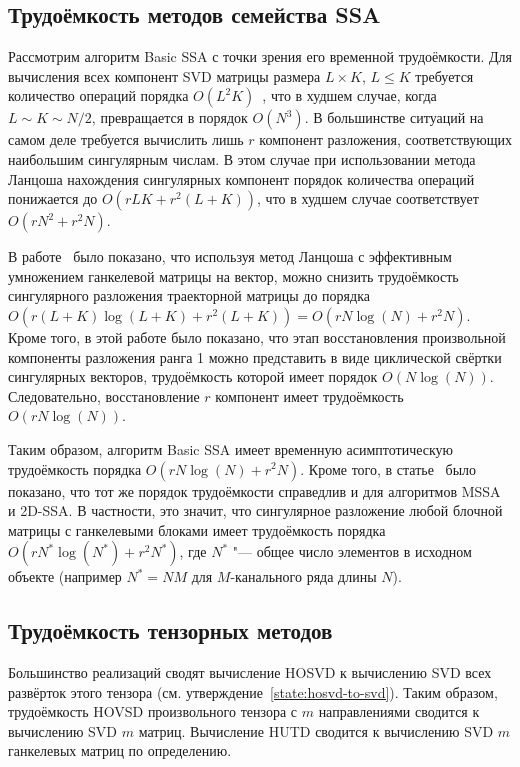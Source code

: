 \documentclass[specialist,
  substylefile = spbu.rtx,
subf,href,colorlinks=true, 12pt]{disser}
\theoremstyle{plain}
\theoremstyle{definition}
\theoremstyle{remark}
\def\newdecomp/{HUTD}
\begin{document}
\subsection{Трудоёмкость методов семейства SSA}\label{subsec:eff-ssa}
Рассмотрим алгоритм Basic SSA с точки зрения его временной трудоёмкости.
Для вычисления всех компонент SVD матрицы размера $L \times K$, $L
\leqslant K$ требуется количество операций порядка $O(L^2
K)$~\cite{Golub1965,Golub1970}, что в
худшем случае, когда $L \sim K \sim N / 2$, превращается в порядок $O(N^3)$.
В большинстве ситуаций на самом деле требуется вычислить лишь $r$ компонент
разложения, соответствующих наибольшим сингулярным числам. В этом
случае при использовании метода Ланцоша нахождения сингулярных
компонент порядок количества операций
понижается до $O(rLK + r^2 (L + K))$, что
в худшем случае соответствует $O(rN^2 + r^2N)$.

В работе~\cite{Korobeynikov2010} было показано, что используя
метод Ланцоша с эффективным умножением ганкелевой матрицы на вектор,
можно снизить трудоёмкость сингулярного разложения траекторной
матрицы до порядка $O(r (L + K) \log(L + K) + r^2 (L + K)) = O(rN
\log(N) + r^2 N)$. Кроме того, в этой работе было показано, что этап
восстановления произвольной компоненты разложения ранга 1 можно представить в
виде циклической свёртки сингулярных векторов, трудоёмкость которой
имеет порядок $O(N \log(N))$. Следовательно, восстановление $r$
компонент имеет трудоёмкость $O(rN \log(N))$.

Таким образом, алгоритм Basic SSA имеет временную асимптотическую
трудоёмкость порядка $O(r N \log (N) + r^2 N)$.
Кроме того, в статье~\cite{mssa2} было показано, что тот же
порядок трудоёмкости
справедлив и для алгоритмов MSSA и 2D-SSA. В частности, это значит,
что сингулярное разложение любой блочной матрицы с ганкелевыми блоками
имеет трудоёмкость порядка $O(r N^{*} \log(N^{*}) + r^2 N^{*})$, где
$N^{*}$ "---
общее число элементов в исходном объекте (например $N^{*} =
NM$ для $M$-канального ряда длины $N$).

\subsection{Трудоёмкость тензорных методов}\label{subsec:eff-tens}
Большинство реализаций сводят вычисление HOSVD к вычислению SVD всех
развёрток этого тензора
(см. утверждение~\ref{state:hosvd-to-svd}).
Таким образом, трудоёмкость HOVSD произвольного тензора с $m$
направлениями сводится к вычислению SVD $m$ матриц. Вычисление
\newdecomp/ сводится к вычислению SVD $m$ ганкелевых матриц по определению.
\end{document}

